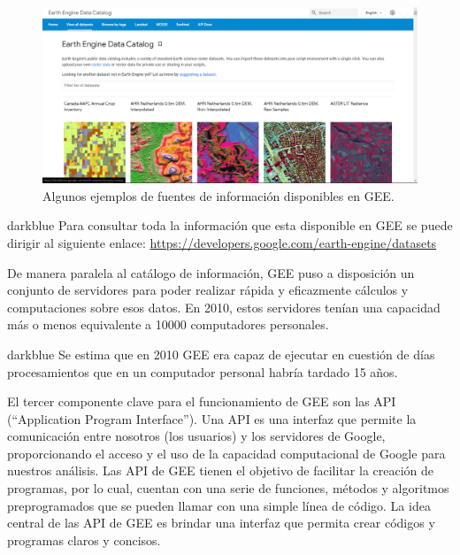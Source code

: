\documentclass[
  12pt,
  letterpaper,
  twoside]{book}
\begin{document}
\begin{figure}[btp]

{\centering \includegraphics[width=1\linewidth]{Img/Datasets} 

}

\caption{Algunos ejemplos de fuentes de información disponibles en GEE.}\label{fig:unnamed-chunk-1}
\end{figure}

\begin{bluebox2}

\begin{awesomeblock}{5pt}{\faLightbulb}{darkblue}
Para consultar toda la información que esta disponible en GEE se puede dirigir al siguiente enlace: \url{https://developers.google.com/earth-engine/datasets}

\end{awesomeblock}

\end{bluebox2}

De manera paralela al catálogo de información, GEE puso a disposición un conjunto de servidores para poder realizar rápida y eficazmente cálculos y computaciones sobre esos datos. En 2010, estos servidores tenían una capacidad más o menos equivalente a 10000 computadores personales.

\begin{bluebox2}

\begin{awesomeblock}{5pt}{\faLightbulb}{darkblue}
Se estima que en 2010 GEE era capaz de ejecutar en cuestión de días procesamientos que en un computador personal habría tardado 15 años.

\end{awesomeblock}

\end{bluebox2}

El tercer componente clave para el funcionamiento de GEE son las API (``Application Program Interface''). Una API es una interfaz que permite la comunicación entre nosotros (los usuarios) y los servidores de Google, proporcionando el acceso y el uso de la capacidad computacional de Google para nuestros análisis. Las API de GEE tienen el objetivo de facilitar la creación de programas, por lo cual, cuentan con una serie de funciones, métodos y algoritmos preprogramados que se pueden llamar con una simple línea de código. La idea central de las API de GEE es brindar una interfaz que permita crear códigos y programas claros y concisos.
\end{document}
